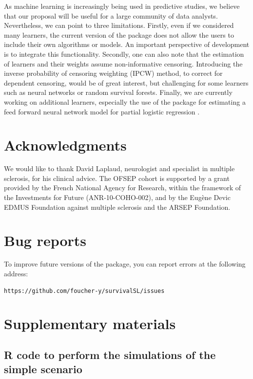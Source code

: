 As machine learning is increasingly being used in predictive studies, we believe that our proposal will be useful for a large community of data analysts. Nevertheless, we can point to three limitations. Firstly, even if we considered many learners, the current version of the package does not allow the users to include their own algorithms or models. An important perspective of development is to integrate this functionality. Secondly, one can also note that the estimation of learners and their weights assume non-informative censoring. Introducing the inverse probability of censoring weighting (IPCW) method, to correct for dependent censoring, would be of great interest, but challenging for some learners such as neural networks or random survival forests. Finally, we are currently working on additional learners, especially the use of the  package for estimating a feed forward neural network model for partial logistic regression \citep{biganzoli_feed_1998}.

\hypertarget{acknowledgments}{%
\section{Acknowledgments}\label{acknowledgments}}

We would like to thank David Laplaud, neurologist and specialist in multiple sclerosis, for his clinical advice. The OFSEP cohort is supported by a grant provided by the French National Agency for Research, within the framework of the Investments for Future (ANR-10-COHO-002), and by the Eugène Devic EDMUS Foundation against multiple sclerosis and the ARSEP Foundation.

\hypertarget{bug-reports}{%
\section{Bug reports}\label{bug-reports}}

To improve future versions of the package, you can report errors at the following address:

\texttt{https://github.com/foucher-y/survivalSL/issues}

\newpage

\hypertarget{supplementary-materials}{%
\section{Supplementary materials}\label{supplementary-materials}}

\hypertarget{r-code-to-perform-the-simulations-of-the-simple-scenario}{%
\subsection{R code to perform the simulations of the simple scenario}\label{r-code-to-perform-the-simulations-of-the-simple-scenario}}

